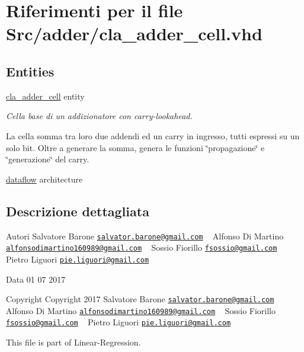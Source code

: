 \hypertarget{cla__adder__cell_8vhd}{}\section{Riferimenti per il file Src/adder/cla\+\_\+adder\+\_\+cell.vhd}
\label{cla__adder__cell_8vhd}
\subsection*{Entities}
\begin{DoxyCompactItemize}
\item 
\hyperlink{classcla__adder__cell}{cla\+\_\+adder\+\_\+cell} entity
\begin{DoxyCompactList}\small\item\em Cella base di un addizionatore con carry-\/lookahead.

La cella somma tra loro due addendi ed un carry in ingresso, tutti espressi su un solo bit. Oltre a generare la somma, genera le funzioni \char`\"{}propagazione\char`\"{} e \char`\"{}generazione\char`\"{} del carry. \end{DoxyCompactList}\item 
\hyperlink{classcla__adder__cell_1_1dataflow}{dataflow} architecture
\end{DoxyCompactItemize}


\subsection{Descrizione dettagliata}
\begin{DoxyAuthor}{Autori}
Salvatore Barone \href{mailto:salvator.barone@gmail.com}{\tt salvator.\+barone@gmail.\+com} ~\newline
 Alfonso Di Martino \href{mailto:alfonsodimartino160989@gmail.com}{\tt alfonsodimartino160989@gmail.\+com} ~\newline
 Sossio Fiorillo \href{mailto:fsossio@gmail.com}{\tt fsossio@gmail.\+com} ~\newline
 Pietro Liguori \href{mailto:pie.liguori@gmail.com}{\tt pie.\+liguori@gmail.\+com} ~\newline

\end{DoxyAuthor}
\begin{DoxyDate}{Data}
01 07 2017
\end{DoxyDate}
\begin{DoxyCopyright}{Copyright}
Copyright 2017 Salvatore Barone \href{mailto:salvator.barone@gmail.com}{\tt salvator.\+barone@gmail.\+com} ~\newline
 Alfonso Di Martino \href{mailto:alfonsodimartino160989@gmail.com}{\tt alfonsodimartino160989@gmail.\+com} ~\newline
 Sossio Fiorillo \href{mailto:fsossio@gmail.com}{\tt fsossio@gmail.\+com} ~\newline
 Pietro Liguori \href{mailto:pie.liguori@gmail.com}{\tt pie.\+liguori@gmail.\+com} ~\newline

\end{DoxyCopyright}
This file is part of Linear-\/\+Regression.

